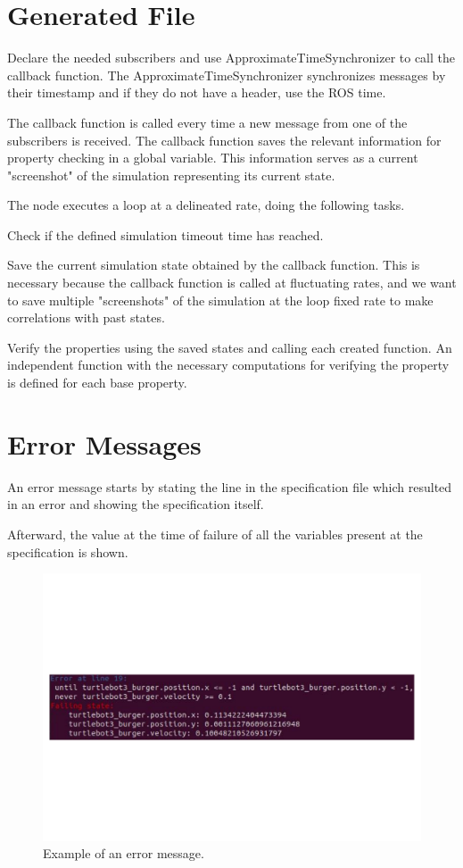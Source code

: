 \section{Generated File}
\label{sec:generatedfile}

Declare the needed subscribers and use ApproximateTimeSynchronizer to call the callback function. The ApproximateTimeSynchronizer synchronizes messages by their timestamp and if they do not have a header, use the ROS time.

The callback function is called every time a new message from one of the subscribers is received. The callback function saves the relevant information for property checking in a global variable. This information serves as a current "screenshot" of the simulation representing its current state.

The node executes a loop at a delineated rate, doing the following tasks. 

Check if the defined simulation timeout time has reached. 

Save the current simulation state obtained by the callback function. This is necessary because the callback function is called at fluctuating rates, and we want to save multiple "screenshots" of the simulation at the loop fixed rate to make correlations with past states. 

Verify the properties using the saved states and calling each created function. An independent function with the necessary computations for verifying the property is defined for each base property.


\section{Error Messages}
\label{sec:errormessages}

An error message starts by stating the line in the specification file which resulted in an error and showing the specification itself.

Afterward, the value at the time of failure of all the variables present at the specification is shown.

\begin{figure}[h]
\includegraphics[width=\textwidth]{images/error_message.pdf}
\caption{Example of an error message.} \label{fig:monerror}
\end{figure}